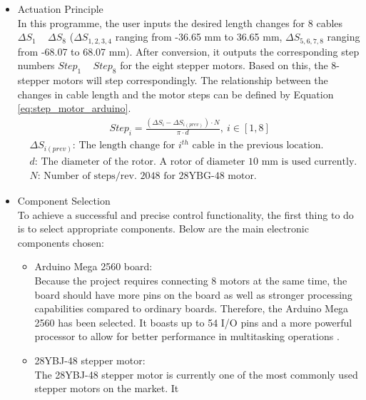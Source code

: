 \begin{itemize}
    \item Actuation Principle\\
    In this programme, the user inputs the desired length changes for 8 cables $\Delta S_1$ ~ $\Delta S_8$ 
    ($\Delta S_{1,2,3,4}$ ranging from -36.65 mm to 36.65 mm, $\Delta S_{5,6,7,8}$ ranging from -68.07 to 68.07 mm). 
    After conversion, it outputs the corresponding step numbers $Step_1$ ~ $Step_8$ for the eight stepper motors. 
    Based on this, the 8-stepper motors will step correspondingly. The relationship between the changes in 
    cable length and the motor steps can be defined by Equation \ref{eq:step_motor_arduino}. \\
    \vspace{-5mm}
    \begin{align}
        & \qquad\qquad\qquad\qquad Step_i=\frac{(\Delta S_i-\Delta S_{i(prev)})\cdot N}{\pi\cdot d}, \ i\in[1,8] 
        \label{eq:step_motor_arduino} \\
        &\Delta S_{i(prev)} \text{: The length change for $i^{th}$ cable in the previous location.} \nonumber \\
        &d\text{: The diameter of the rotor. A rotor of diameter 10 mm is used currently.} \nonumber \\
        &N\text{: Number of steps/rev. 2048 for 28YBG-48 motor.}\nonumber 
    \end{align}
    \vspace{-15mm}
    \item Component Selection \\
    To achieve a successful and precise control functionality, the first thing to do is to select appropriate 
    components. Below are the main electronic components chosen:
    \begin{itemize}
        \item Arduino Mega 2560 board: \\
        Because the project requires connecting 8 motors at the same time, the board should have more pins on the 
        board as well as stronger processing capabilities compared to ordinary boards. Therefore, the Arduino Mega 
        2560 has been selected. It boasts up to 54 I/O pins and a more powerful processor to allow for better 
        performance in multitasking operations \cite{arduino_guide}.
        \item 28YBJ-48 stepper motor: \\
        The 28YBJ-48 stepper motor is currently one of the most commonly used stepper motors on the market. It 

\end{itemize}
\end{itemize}
